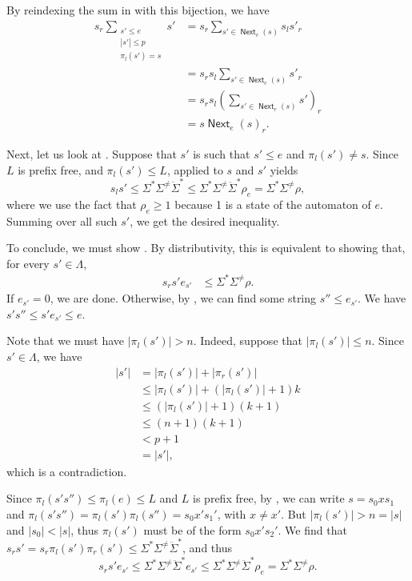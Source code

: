 \documentclass[11pt,a4paper]{amsart}
\theoremstyle{definition}
\DeclareMathOperator{\Next}{\mathsf{Next}}
\begin{document}
\begin{proofEnd}
  By reindexing the sum in  with this
  bijection, we have
  \begin{align*}
    s_r \sum _{\substack{s' \leq e \\ |s'|  \leq  p \\  \pi _l(s') = s}} s'
    & = s_r \sum _{s'  \in  \Next_e(s)} s_ls'_r \\
    & = s_rs_l \sum _{s'  \in  \Next_e(s)} s'_r \\
    & = s_rs_l\left( \sum _{s'  \in  \Next_e(s)} s'\right)_r \\
    & = s \Next_e(s)_r.
  \end{align*}

  Next, let us look at .  Suppose that $s'$
  is such that $s'  \leq  e$ and $ \pi _l(s')  \neq  s$.  Since $L$ is prefix free, and
  $ \pi _l(s')  \leq  L$,  applied to $s$ and $s'$ yields
  \[ s_ls'  \leq   \Sigma ^* \Sigma ^{ \neq }\ddot{ \Sigma }^*  \leq   \Sigma ^* \Sigma ^{ \neq }\ddot{ \Sigma }^* \rho _e =  \Sigma ^* \Sigma ^{ \neq } \rho , \] where we
  use the fact that $ \rho _e  \geq  1$ because 1 is a state of the automaton of $e$.
  Summing over all such $s'$, we get the desired inequality.

  To conclude, we must show .  By
  distributivity, this is equivalent to showing that, for every $s'  \in   \Lambda $,
  \begin{align*}
    s_r s' e_{s'}
    &  \leq   \Sigma ^* \Sigma ^{ \neq } \rho  \label{eq:representable-goal-3}.
  \end{align*}
  If $e_{s'} = 0$, we are done. Otherwise, by
  , we can find some string $s''  \leq  e_{s'}$.
  We have $s's''  \leq  s'e_{s'}  \leq  e$.

  Note that we must have $| \pi _l(s')| > n$.  Indeed, suppose that $| \pi _l(s')|  \leq  n$.
  Since $s'  \in   \Lambda $, we have
  \begin{align*}
    |s'|
    & = | \pi _l(s')|+| \pi _r(s')| \\
    &  \leq  | \pi _l(s')|+(| \pi _l(s')|+1)k \\
    &  \leq  (| \pi _l(s')|+1)(k+1) \\
    &  \leq  (n+1)(k+1) \\
    & < p+1 \\
    & = |s'|,
  \end{align*}
  which is a contradiction.

  Since $ \pi _l(s's'')  \leq   \pi _l(e)  \leq  L$ and $L$ is prefix free, by
  , we can write $s = s_0xs_1$ and
  $ \pi _l(s's'') =  \pi _l(s') \pi _l(s'') = s_0x's_1'$, with $x  \neq  x'$.  But
  $| \pi _l(s')| > n = |s|$ and $|s_0| < |s|$, thus $ \pi _l(s')$ must be of the form
  $s_0x's_2'$.  We find that $s_rs' = s_r \pi _l(s') \pi _r(s')  \leq   \Sigma ^* \Sigma ^{ \neq }\ddot{ \Sigma }^*$,
  and thus
  \[ s_rs'e_{s'}  \leq   \Sigma ^* \Sigma ^{ \neq }\ddot{ \Sigma }^*e_{s'}  \leq   \Sigma ^* \Sigma ^{ \neq }\ddot{ \Sigma }^* \rho _e =
     \Sigma ^* \Sigma ^{ \neq } \rho . \]
\end{proofEnd}
\end{document}
